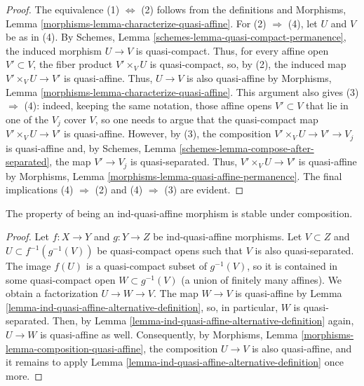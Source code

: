 \begin{proof}
The equivalence (1) $\Leftrightarrow$ (2)
follows from the definitions and
Morphisms, Lemma \ref{morphisms-lemma-characterize-quasi-affine}.
For (2) $\Rightarrow$ (4), let $U$ and $V$ be as in (4). By
Schemes, Lemma \ref{schemes-lemma-quasi-compact-permanence}, the
induced morphism $U \to V$ is quasi-compact. Thus, for every affine
open $V' \subset V$, the fiber product $V' \times_V U$ is quasi-compact,
so, by (2), the induced map $V' \times_V U \to V'$ is quasi-affine.
Thus, $U \to V$ is also quasi-affine by
Morphisms, Lemma \ref{morphisms-lemma-characterize-quasi-affine}.
This argument also gives (3) $\Rightarrow$ (4): indeed, keeping the
same notation, those affine opens $V' \subset V$ that lie in one
of the $V_j$ cover $V$, so one needs to argue that the
quasi-compact map $V' \times_V U \to V'$ is quasi-affine.
However, by (3), the composition $V' \times_V U \to V' \to V_j$
is quasi-affine and, by
Schemes, Lemma \ref{schemes-lemma-compose-after-separated}, the map
$V' \to V_j$ is quasi-separated. Thus, $V' \times_V U \to V'$
is quasi-affine by
Morphisms, Lemma \ref{morphisms-lemma-quasi-affine-permanence}.
The final implications (4) $\Rightarrow$ (2) and (4) $\Rightarrow$ (3)
are evident.
\end{proof}

\begin{lemma}
\label{lemma-ind-quasi-affine-composition}
The property of being an ind-quasi-affine morphism is stable under composition.
\end{lemma}

\begin{proof}
Let $f : X \to Y$ and $g : Y \to Z$ be ind-quasi-affine morphisms.
Let $V \subset Z$ and $U \subset f^{-1}(g^{-1}(V))$ be quasi-compact
opens such that $V$ is also quasi-separated. The image $f(U)$ is a
quasi-compact subset of $g^{-1}(V)$, so it is contained in some
quasi-compact open $W \subset g^{-1}(V)$ (a union of finitely many affines).
We obtain a factorization $U \to W \to V$. The map $W \to V$ is quasi-affine
by Lemma \ref{lemma-ind-quasi-affine-alternative-definition}, so, in
particular, $W$ is quasi-separated. Then, by
Lemma \ref{lemma-ind-quasi-affine-alternative-definition} again, $U \to W$
is quasi-affine as well. Consequently, by Morphisms,
Lemma \ref{morphisms-lemma-composition-quasi-affine}, the composition
$U \to V$ is also quasi-affine, and it remains to apply
Lemma \ref{lemma-ind-quasi-affine-alternative-definition} once more.
\end{proof}

